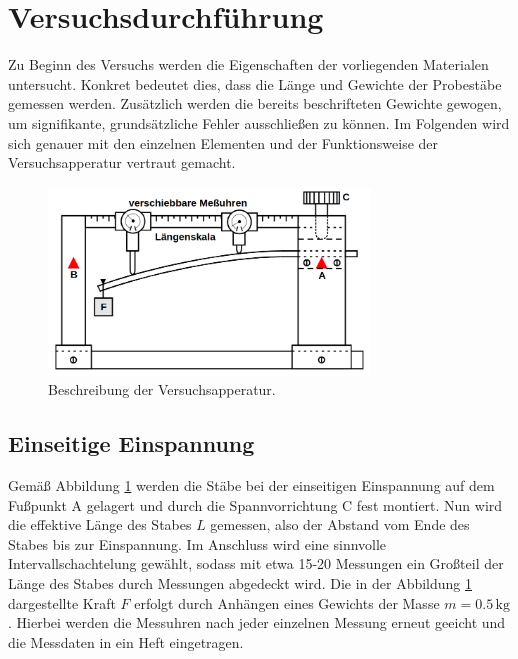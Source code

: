 



\section{Versuchsdurchführung}
\label{sec:Versuchsdurchfuehrung}

Zu Beginn des Versuchs werden die Eigenschaften der vorliegenden Materialen untersucht. Konkret bedeutet dies,
dass die Länge und Gewichte der Probestäbe gemessen werden. Zusätzlich werden die bereits beschrifteten Gewichte gewogen,
um signifikante, grundsätzliche Fehler ausschließen zu können. Im Folgenden wird sich genauer mit den einzelnen Elementen
und der Funktionsweise der Versuchsapperatur vertraut gemacht.

\begin{figure}[H]
    \centering
    \includegraphics[height=5cm]{Versuchsaufbau.png}
    \caption{Beschreibung der Versuchsapperatur.}
    \label{fig:Versuchsaufbau}
\end{figure}

\subsection{Einseitige Einspannung}
\label{sec:Einseitig}
Gemäß Abbildung \ref{fig:Versuchsaufbau} werden die Stäbe bei der einseitigen Einspannung auf dem Fußpunkt A gelagert
und durch die Spannvorrichtung C fest montiert. Nun wird die effektive Länge des Stabes $L$ gemessen, also der Abstand vom Ende des Stabes bis zur Einspannung.
Im Anschluss wird eine sinnvolle Intervallschachtelung gewählt, sodass mit etwa 15-20 Messungen ein Großteil der Länge des Stabes
durch Messungen abgedeckt wird. Die in der Abbildung \ref{fig:Versuchsaufbau} dargestellte Kraft $F$ erfolgt durch Anhängen eines
Gewichts der Masse $m = 0.5\,\unit{\kilo\gram}$. Hierbei werden die Messuhren nach jeder einzelnen Messung erneut geeicht und
die Messdaten in ein Heft eingetragen.

